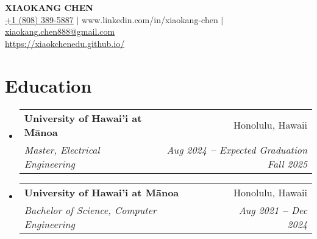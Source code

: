 \documentclass[letterpaper,11pt]{article}
\makeatletter
\newcommand{\resumeSubheading}[4]{
  \vspace{-2pt}\item
    \begin{tabular*}{0.97\textwidth}[t]{l@{\extracolsep{\fill}}r}
      \textbf{#1} & #2 \\
      \textit{\small#3} & \textit{\small #4} \\
    \end{tabular*}\vspace{-7pt}
}
\newcommand{\resumeSubHeadingListStart}{\begin{itemize}[leftmargin=0.15in, label={}]}
\newcommand{\resumeSubHeadingListEnd}{\end{itemize}}
\makeatother
\begin{document}

\begin{center}
    \textbf{\Huge \scshape XIAOKANG CHEN} \\ \vspace{3pt}
    \small
    \hspace{.5pt} \href{tel:18083895887}{+1 (808) 389-5887}\hspace{.5pt} $|$\hspace{.5pt} {www.linkedin.com/in/xiaokang-chen}\hspace{.5pt} $|$\hspace{.5pt} \href{mailto:xiaokang.chen888@gmail.com}{xiaokang.chen888@gmail.com} \\
    \hspace{.5pt} \href{https://xiaokchenedu.github.io/}{https://xiaokchenedu.github.io/} \\
\end{center}


\section{Education}
  \vspace{3pt}
  \resumeSubHeadingListStart
    
  \resumeSubheading
    {University of Hawai'i at Mānoa}{Honolulu, Hawaii}
    {Master, Electrical Engineering}{Aug 2024 \textbf{--} Expected Graduation Fall 2025}
  \resumeSubheading
    {University of Hawai'i at Mānoa}{Honolulu, Hawaii}
    {Bachelor of Science, Computer Engineering}{Aug 2021 \textbf{--} Dec 2024}
  \resumeSubHeadingListEnd


        
\end{document}

